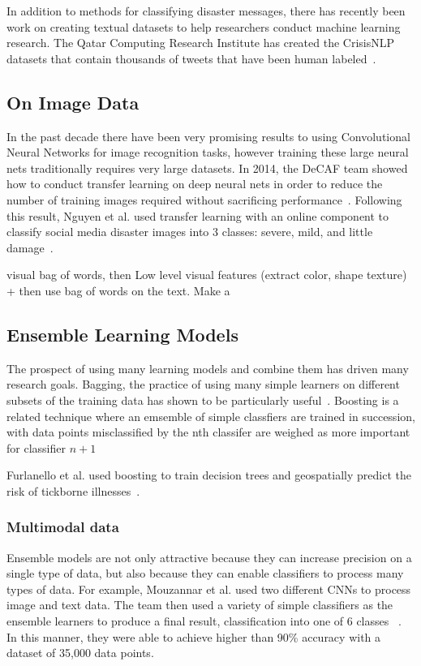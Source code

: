 In addition to methods for classifying disaster messages, there has recently been work 
on creating textual datasets to help researchers conduct machine learning research. 
The Qatar Computing Research Institute has created the CrisisNLP datasets that 
contain thousands of tweets that have been human labeled~\cite{nguyenRapidClassificationCrisisRelated}.

\subsection{On Image Data}
In the past decade there have been very promising results to using Convolutional Neural Networks
for image recognition tasks, however training these large neural nets traditionally
requires very large datasets. In 2014, the DeCAF team showed how to conduct 
transfer learning on deep neural nets in order to reduce the number of 
training images required without sacrificing performance~\cite{donahueDeCAFDeepConvolutional2013}.
Following this result, Nguyen et al. used transfer learning with an online component 
to classify social media disaster images into 3 classes: severe, mild, and little
damage~\cite{nguyenDamageAssessmentSocial2017}. 

  visual bag of words, then Low level visual features (extract color, shape texture) + then use bag of words
  on the text. Make a~\cite{jomaaSemanticVisualCues2016}

\subsection{Ensemble Learning Models}
  The prospect of using many learning models and combine them has driven many 
  research goals. Bagging, the practice of using many simple learners on different 
  subsets of the training data has shown to be particularly useful~\cite{breimanBaggingPredictors1996}.
  Boosting is a related technique where an emsemble of simple classfiers are trained in succession, with
  data points misclassified by the nth classifer are weighed as more important for classifier $n+1$
  
  Furlanello et al. used boosting to train decision trees and geospatially predict
  the risk of tickborne illnesses~\cite{furlanelloBoostingTreeBasedClassifiers2000}.
  
  
  \subsubsection{Multimodal data} 
  Ensemble models are not only attractive because they can increase precision on a
  single type of data, but also because they can enable classifiers to process
  many types of data. For example, Mouzannar et al. used two different CNNs to 
  process image and text data. The team then used a variety of simple classifiers 
  as the ensemble learners to produce a final result,
  classification into one of 6 classes ~\cite{mouzannarDamageIdentificationSocial2018}.
  In this manner, they were able to achieve higher than 90\% accuracy with a dataset of 
  35,000 data points.

